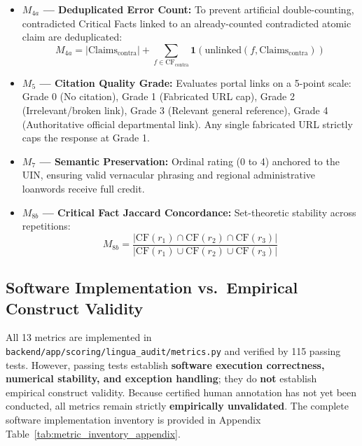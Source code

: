 \documentclass[11pt,a4paper]{article}
\begin{document}
\begin{itemize}
  \item \textbf{$M_{4a}$ --- Deduplicated Error Count:} To prevent artificial double-counting, contradicted Critical Facts linked to an already-counted contradicted atomic claim are deduplicated:
    \begin{equation}
    \label{eq:m4a}
    M_{4a} = |\text{Claims}_{\text{contra}}| + \sum_{f \in \text{CF}_{\text{contra}}} \mathbf{1}(\text{unlinked}(f, \text{Claims}_{\text{contra}}))
    \end{equation}
  \item \textbf{$M_5$ --- Citation Quality Grade:} Evaluates portal links on a 5-point scale: Grade 0 (No citation), Grade 1 (Fabricated URL cap), Grade 2 (Irrelevant/broken link), Grade 3 (Relevant general reference), Grade 4 (Authoritative official departmental link). Any single fabricated URL strictly caps the response at Grade 1.
  \item \textbf{$M_7$ --- Semantic Preservation:} Ordinal rating (0 to 4) anchored to the UIN, ensuring valid vernacular phrasing and regional administrative loanwords receive full credit.
  \item \textbf{$M_{8b}$ --- Critical Fact Jaccard Concordance:} Set-theoretic stability across repetitions:
    \begin{equation}
    \label{eq:m8b}
    M_{8b} = \frac{|\text{CF}(r_1) \cap \text{CF}(r_2) \cap \text{CF}(r_3)|}{|\text{CF}(r_1) \cup \text{CF}(r_2) \cup \text{CF}(r_3)|}
    \end{equation}
\end{itemize}

\subsection{Software Implementation vs.\ Empirical Construct Validity}
\label{sec:software_vs_empirical}

All 13 metrics are implemented in \texttt{backend/app/scoring/lingua\_audit/metrics.py} and verified by 115 passing tests. However, passing tests establish \textbf{software execution correctness, numerical stability, and exception handling}; they do \textbf{not} establish empirical construct validity. Because certified human annotation has not yet been conducted, all metrics remain strictly \textbf{empirically unvalidated}. The complete software implementation inventory is provided in Appendix Table~\ref{tab:metric_inventory_appendix}.

\end{document}

